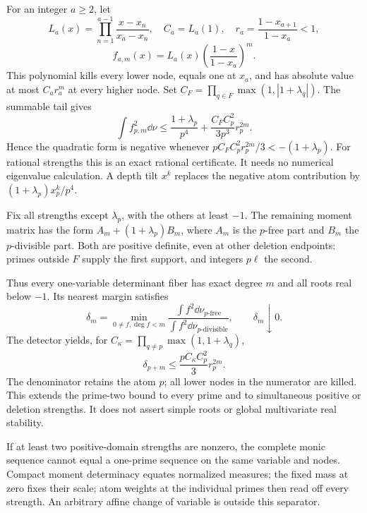 For an integer $a\ge2$, let
\[
L_a(x)=\prod_{n=1}^{a-1}\frac{x-x_n}{x_a-x_n},\quad
C_a=L_a(1),\quad r_a=\frac{1-x_{a+1}}{1-x_a}<1,
\]
\[
f_{a,m}(x)=L_a(x)\left(\frac{1-x}{1-x_a}\right)^m.
\]
This polynomial kills every lower node, equals one at $x_a$, and has
absolute value at most $C_ar_a^m$ at every higher node.
Set $C_F=\prod_{q\in F}\max(1,|1+\lambda_q|)$. The summable tail gives
\[
\int f_{p,m}^2\dd\nu
\le\frac{1+\lambda_p}{p^4}+
\frac{C_FC_p^2}{3p^3}r_p^{2m}.
\]
Hence the quadratic form is negative whenever
$pC_FC_p^2r_p^{2m}/3<-(1+\lambda_p)$.
For rational strengths this is an exact rational certificate. It needs no
numerical eigenvalue calculation. A depth tilt $x^k$ replaces the negative
atom contribution by $(1+\lambda_p)x_p^k/p^4$.

Fix all strengths except $\lambda_p$, with the others at least $-1$.
The remaining moment matrix has the form $A_m+(1+\lambda_p)B_m$, where
$A_m$ is the $p$-free part and $B_m$ the $p$-divisible part. Both are
positive definite, even at other deletion endpoints: primes outside $F$
supply the first support, and integers $p\ell$ the second.

Thus every one-variable determinant fiber has exact degree $m$ and all
roots real below $-1$. Its nearest margin satisfies
\[
\delta_m=\min_{0\ne f,\deg f<m}
\frac{\int f^2\dd\nu_{p\text{-free}}}
{\int f^2\dd\nu_{p\text{-divisible}}},\qquad\delta_m\downarrow0.
\]
The detector yields, for $C_\kappa=\prod_{q\ne p}\max(1,1+\lambda_q)$,
\[
\delta_{p+m}\le\frac{pC_\kappa C_p^2}{3}r_p^{2m}.
\]
The denominator retains the atom $p$; all lower nodes in the numerator are
killed. This extends the prime-two bound to every prime and to simultaneous
positive or deletion strengths. It does not assert simple roots or global
multivariate real stability.

If at least two positive-domain strengths are nonzero, the complete monic
sequence cannot equal a one-prime sequence on the same variable and nodes.
Compact moment determinacy equates normalized measures; the fixed mass at
zero fixes their scale; atom weights at the individual primes then read off
every strength. An arbitrary affine change of variable is outside this separator.
